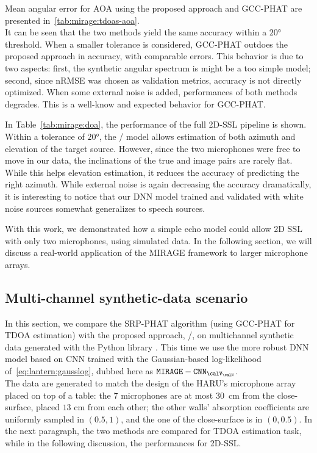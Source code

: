 Mean angular error for \ac{AOA} using the proposed approach and \ac{GCC-PHAT} are presented in~\cref{tab:mirage:tdoas-aoa}.
\\It can be seen that the two methods yield the same accuracy within a $\ang{20}$ threshold.
When a smaller tolerance is considered, GCC-PHAT outdoes the proposed approach in accuracy, with comparable errors.
This behavior is due to two aspects: first, the synthetic angular spectrum is might be a too simple model; second, since \ac{nRMSE} was chosen as validation metrics, accuracy is not directly optimized.
When some external noise is added,  performances of both methods degrades.
This is a well-know and expected behavior for GCC-PHAT.


\mynewline
In Table~\cref{tab:mirage:doa}, the performance of the full 2D-SSL pipeline is shown.
Within a tolerance of $\ang{20}$, the \MIRAGE/ model allows estimation of both azimuth and elevation of the target source.
However, since the two microphones were free to move in our data, the inclinations of the true and image pairs are rarely flat.
While this helps elevation estimation, it reduces the accuracy of predicting the right azimuth.
While external noise is again decreasing the accuracy dramatically,
it is interesting to notice that our \ac{DNN} model trained and validated with white noise sources somewhat generalizes to speech sources.

\mynewline
With this work, we demonstrated how a simple echo model could allow 2D SSL with only two microphones, using simulated data.
In the following section, we will discuss a real-world application of the \ac{MIRAGE} framework to larger microphone arrays.

\newcommand{\MIRAGECNN}{\ensuremath{\mathtt{MIRAGE-CNN}_{\calV_\calN}}}
\subsection{Multi-channel synthetic-data scenario}
In this section, we compare the \ac{SRP-PHAT} algorithm (using GCC-PHAT for TDOA estimation) with the proposed approach, \MIRAGE/, on multichannel synthetic data generated with the Python library .
This time we use the more robust \ac{DNN} model based on \ac{CNN} trained with the Gaussian-based log-likelihood of~\cref{eq:lantern:gausslog}, dubbed here as $\MIRAGECNN$.
\\The data are generated to match the design of the HARU's microphone array placed on top of a table:
the 7 microphones are at most 30~cm from the close-surface, placed $13$ cm from each other; the other walls' absorption coefficients are uniformly sampled in $(0.5, 1)$, and the one of the close-surface is in $(0, 0.5)$.
In the next paragraph, the two methods are compared for \ac{TDOA} estimation task, while in the following discussion, the performances for 2D-\ac{SSL}.

